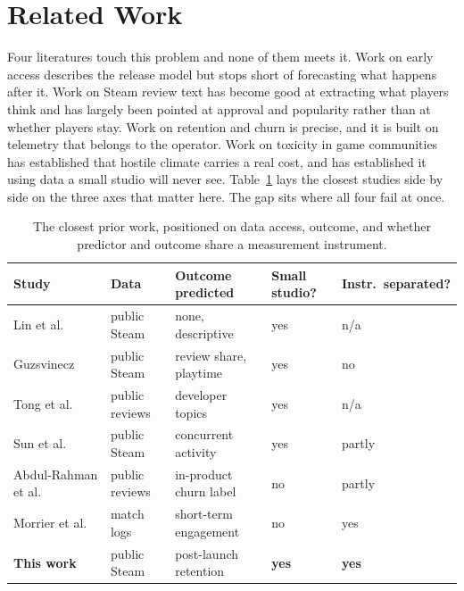 \documentclass[sigconf]{acmart}
\begin{document}
\section{Related Work}
\label{sec:related}

Four literatures touch this problem and none of them meets it. Work on early access describes the
release model but stops short of forecasting what happens after it. Work on Steam review text has
become good at extracting what players think and has largely been pointed at approval and
popularity rather than at whether players stay. Work on retention and churn is precise, and it is
built on telemetry that belongs to the operator. Work on toxicity in game communities has
established that hostile climate carries a real cost, and has established it using data a small
studio will never see. Table~\ref{tab:position} lays the closest studies side by side on the three
axes that matter here. The gap sits where all four fail at once.

\begin{table}[t]
\centering
\caption{The closest prior work, positioned on data access, outcome, and whether predictor and
outcome share a measurement instrument.}
\label{tab:position}
\footnotesize
\begin{tabular}{@{}p{1.75cm}p{1.15cm}p{1.6cm}p{0.9cm}p{1.0cm}@{}}
\toprule
\textbf{Study} & \textbf{Data} & \textbf{Outcome predicted} & \textbf{Small studio?} &
\textbf{Instr.\ separated?} \\
\midrule
Lin et al.~\cite{LinBezemerHassan2018} & public Steam & none, descriptive & yes & n/a \\
Guzsvinecz~\cite{Guzsvinecz2022} & public Steam & review share, playtime & yes & no \\
Tong et al.~\cite{TongWillcockSun2025} & public reviews & developer topics & yes & n/a \\
Sun et al.~\cite{Sun2026} & public Steam & concurrent activity & yes & partly \\
Abdul-Rahman et al.~\cite{AbdulRahman2024} & public reviews & in-product churn label & no &
partly \\
Morrier et al.~\cite{Morrier2025} & match logs & short-term engagement & no & yes \\
\midrule
\textbf{This work} & public Steam & post-launch retention & \textbf{yes} & \textbf{yes} \\
\bottomrule
\end{tabular}
\end{table}
\end{document}
